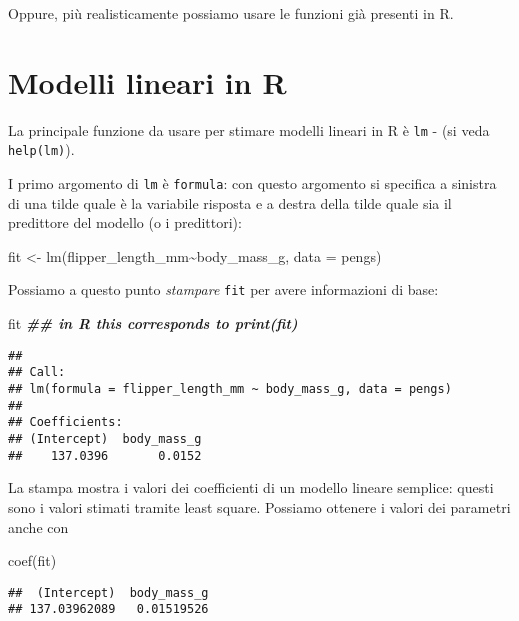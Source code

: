 \documentclass[
]{article}
\newenvironment{Shaded}{\begin{snugshade}}{\end{snugshade}}
\newcommand{\AttributeTok}[1]{\textcolor[rgb]{0.77,0.63,0.00}{#1}}
\newcommand{\DocumentationTok}[1]{\textcolor[rgb]{0.56,0.35,0.01}{\textbf{\textit{#1}}}}
\newcommand{\FunctionTok}[1]{\textcolor[rgb]{0.00,0.00,0.00}{#1}}
\newcommand{\NormalTok}[1]{#1}
\newcommand{\OtherTok}[1]{\textcolor[rgb]{0.56,0.35,0.01}{#1}}
\newcommand{\SpecialCharTok}[1]{\textcolor[rgb]{0.00,0.00,0.00}{#1}}
\begin{document}
Oppure, più realisticamente possiamo usare le funzioni già presenti in
R.

\hypertarget{modelli-lineari-in-r}{%
\section{Modelli lineari in R}\label{modelli-lineari-in-r}}

La principale funzione da usare per stimare modelli lineari in R è
\texttt{lm} - (si veda \texttt{help(lm)}).

I primo argomento di \texttt{lm} è \texttt{formula}: con questo
argomento si specifica a sinistra di una tilde quale è la variabile
risposta e a destra della tilde quale sia il predittore del modello (o i
predittori):

\begin{Shaded}
\begin{Highlighting}[]
\NormalTok{fit }\OtherTok{\textless{}{-}} \FunctionTok{lm}\NormalTok{(flipper\_length\_mm}\SpecialCharTok{\textasciitilde{}}\NormalTok{body\_mass\_g, }\AttributeTok{data =}\NormalTok{ pengs)}
\end{Highlighting}
\end{Shaded}

Possiamo a questo punto \emph{stampare} \texttt{fit} per avere
informazioni di base:

\begin{Shaded}
\begin{Highlighting}[]
\NormalTok{fit }\DocumentationTok{\#\# in R this corresponds to print(fit)}
\end{Highlighting}
\end{Shaded}

\begin{verbatim}
## 
## Call:
## lm(formula = flipper_length_mm ~ body_mass_g, data = pengs)
## 
## Coefficients:
## (Intercept)  body_mass_g  
##    137.0396       0.0152
\end{verbatim}

La stampa mostra i valori dei coefficienti di un modello lineare
semplice: questi sono i valori stimati tramite least square. Possiamo
ottenere i valori dei parametri anche con

\begin{Shaded}
\begin{Highlighting}[]
\FunctionTok{coef}\NormalTok{(fit)}
\end{Highlighting}
\end{Shaded}

\begin{verbatim}
##  (Intercept)  body_mass_g 
## 137.03962089   0.01519526
\end{verbatim}
\end{document}
